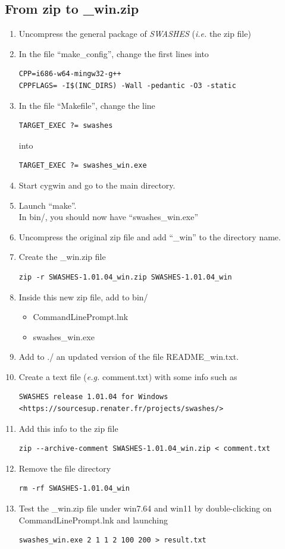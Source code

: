 \documentclass[a4paper, 11pt]{article}
\newcommand{\SWASHES}{\emph{SWASHES}}
\begin{document}
\subsection{From zip to \_win.zip}
\begin{enumerate}
\item Uncompress the general package of \SWASHES{} (\emph{i.e.} the zip file)
\item In the file ``make\_config'', change the first lines into
\begin{verbatim}
CPP=i686-w64-mingw32-g++
CPPFLAGS= -I$(INC_DIRS) -Wall -pedantic -O3 -static
\end{verbatim}
\item In the file ``Makefile'', change the line
\begin{verbatim}
TARGET_EXEC ?= swashes
\end{verbatim}
into
\begin{verbatim}
TARGET_EXEC ?= swashes_win.exe
\end{verbatim}
\item Start cygwin and go to the main directory.
\item Launch ``make''.\\
In bin/, you should now have ``swashes\_win.exe''
\item Uncompress the original zip file and add ``\_win'' to the directory name.
\item Create the \_win.zip file
\begin{verbatim}
zip -r SWASHES-1.01.04_win.zip SWASHES-1.01.04_win
\end{verbatim}
\item Inside this new zip file, add to bin/
\begin{itemize}
		\item CommandLinePrompt.lnk
		\item swashes\_win.exe
\end{itemize}
\item Add to ./ an updated version of the file README\_win.txt.
\item Create a text file (\emph{e.g.} comment.txt) with some info such as
\begin{verbatim}
SWASHES release 1.01.04 for Windows
<https://sourcesup.renater.fr/projects/swashes/>
\end{verbatim}
\item Add this info to the zip file
\begin{verbatim}
zip --archive-comment SWASHES-1.01.04_win.zip < comment.txt
\end{verbatim}
\item Remove the file directory
\begin{verbatim}
rm -rf SWASHES-1.01.04_win
\end{verbatim}
\item Test the \_win.zip file under win7.64 and win11 by
double-clicking on CommandLinePrompt.lnk and launching
\begin{verbatim}
swashes_win.exe 2 1 1 2 100 200 > result.txt
\end{verbatim}
\end{enumerate}
\end{document}
